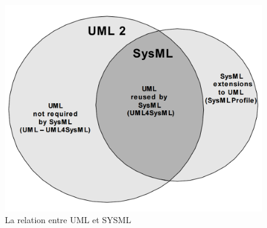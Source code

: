 \documentclass[french]{spimufcphdthesis}
\begin{document}
\begin{figure}[H]
\begin{center}
\includegraphics[scale=0.2]{figures/relationshipUS.png}
\caption{La relation entre UML et SYSML}
\label{relationUS}
\end{center}
\end{figure}
\end{document}
